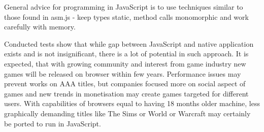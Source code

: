 General advice for programming in JavaScript is to use techniques similar to those found in asm.js - keep types static, method calls monomorphic and work carefully with memory.

Conducted tests show that while gap between JavaScript and native application exists and is not insignificant, there is a lot of potential in such approach. It is expected, that with growing community and interest from game industry new games will be released on browser within few years. Performance issues may prevent works on AAA titles, but companies focused more on social aspect of games and new trends in monetisation may create games targeted for different users. With capabilities of browsers equal to having 18 months older machine, less graphically demanding titles like The Sims or World or Warcraft may certainly be ported to run in JavaScript.

